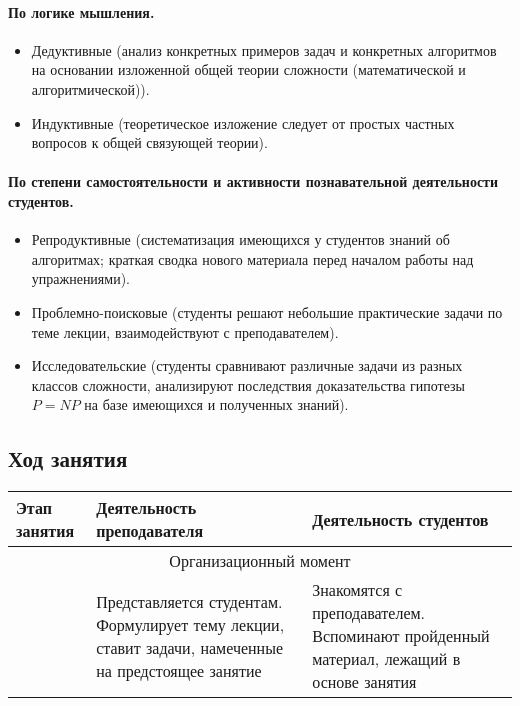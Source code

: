 \begin{refsection}
    \paragraph{По логике мышления.} \begin{itemize}
        \item Дедуктивные (анализ конкретных примеров задач и конкретных алгоритмов на основании изложенной общей теории сложности (математической и алгоритмической)).
        \item Индуктивные (теоретическое изложение следует от простых частных вопросов к общей связующей теории).
    \end{itemize}

    \paragraph{По степени самостоятельности и активности познавательной деятельности студентов.} \begin{itemize}
        \item Репродуктивные (систематизация имеющихся у студентов знаний об алгоритмах; краткая сводка нового материала перед началом работы над упражнениями).
        \item Проблемно-поисковые (студенты решают небольшие практические задачи по теме лекции, взаимодействуют с преподавателем).
        \item Исследовательские (студенты сравнивают различные задачи из разных классов сложности, анализируют последствия доказательства гипотезы $P = NP$ на базе имеющихся и полученных знаний).
    \end{itemize}

\subsection{Ход занятия}

\noindent\begin{longtable}{| p{} | p{} | p{} |}\hline
    {\textbf{Этап занятия}} &
    {\textbf{Деятельность преподавателя}} &
    {\textbf{Деятельность студентов}} \\ \hline

    \multicolumn{3}{|c|}{Организационный момент} \\ \hline

    {} &
    {Представляется студентам. Формулирует тему лекции, ставит задачи, намеченные на предстоящее занятие} &
    {Знакомятся с преподавателем. Вспоминают пройденный материал, лежащий в основе занятия} \\ \hline


\end{longtable}
\end{refsection}
